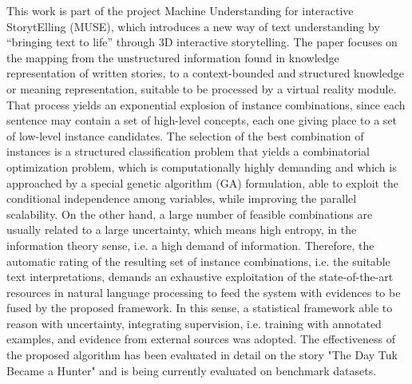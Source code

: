 \documentclass[10pt, a4paper, twopage, headinclude, footinclude, BCOR5mm]{book}
\begin{document}
\begin{table}[t!]
\end{table} 
\begin{table}[t!]
\end{table} 
\noindent
This work is part of the project Machine Understanding for interactive StorytElling (MUSE), which introduces a new way of text understanding by “bringing text to life” through 3D interactive storytelling. The paper focuses on the mapping from the unstructured information found in knowledge representation of written stories, to a context-bounded and structured knowledge or meaning representation, suitable to be processed by a virtual reality module. That process yields an exponential explosion of instance combinations, since each sentence may contain a set of high-level concepts, each one giving place to a set of low-level instance candidates. The selection of the best combination of instances is a structured classification problem that yields a combinatorial optimization problem, which is computationally highly demanding and which is approached by a special genetic algorithm (GA) formulation, able to exploit the conditional independence among variables, while improving the parallel scalability. On the other hand, a large number of feasible combinations are usually related to a large uncertainty, which means high entropy, in the information theory sense, i.e. a high demand of information. Therefore, the automatic rating of the resulting set of instance combinations, i.e. the suitable text interpretations, demands an exhaustive exploitation of the state-of-the-art resources in natural language processing to feed the system with evidences to be fused by the proposed framework. In this sense, a statistical framework able to reason with uncertainty, integrating supervision, i.e. training with annotated examples, and evidence from external sources was adopted. The effectiveness of the proposed algorithm has been evaluated in detail on the story "The Day Tuk Became a Hunter" and is being currently evaluated on benchmark datasets.  
\end{document}
